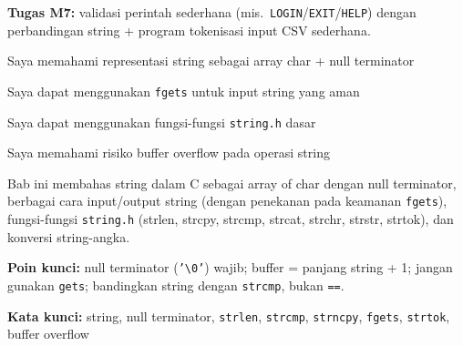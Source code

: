 \documentclass[../main.tex]{subfiles}
\begin{document}
\begin{asesmen}
\textbf{Tugas M7:} validasi perintah sederhana (mis.\ \texttt{LOGIN}/\texttt{EXIT}/\texttt{HELP}) dengan perbandingan string + program tokenisasi input CSV sederhana.
\end{asesmen}

\begin{checklist}
  \item Saya memahami representasi string sebagai array char + null terminator
  \item Saya dapat menggunakan \texttt{fgets} untuk input string yang aman
  \item Saya dapat menggunakan fungsi-fungsi \texttt{string.h} dasar
  \item Saya memahami risiko buffer overflow pada operasi string
\end{checklist}

\begin{rangkuman}
Bab ini membahas string dalam C sebagai array of char dengan null terminator, berbagai cara input/output string (dengan penekanan pada keamanan \texttt{fgets}), fungsi-fungsi \texttt{string.h} (strlen, strcpy, strcmp, strcat, strchr, strstr, strtok), dan konversi string-angka.

\textbf{Poin kunci:} null terminator (\texttt{'\textbackslash 0'}) wajib; buffer = panjang string + 1; jangan gunakan \texttt{gets}; bandingkan string dengan \texttt{strcmp}, bukan \texttt{==}.

\textbf{Kata kunci:} string, null terminator, \texttt{strlen}, \texttt{strcmp}, \texttt{strncpy}, \texttt{fgets}, \texttt{strtok}, buffer overflow
\end{rangkuman}
\end{document}
